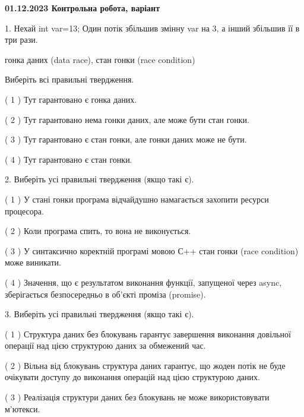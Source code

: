 \documentclass[12pt, ukrainian]{article}
\begin{document}
\vspace{4mm}
\newpage
\begin {large}

\textbf{01.12.2023 Контрольна робота, варіант  }\par


{
1. Нехай int var=13; Один потік збільшив змінну var на 3, а інший збільшив її в три рази.

гонка даних (data race), стан гонки (race condition)

Виберіть всі правильні твердження.\par
\vspace{2mm}
( 1 ) Тут гарантовано є гонка даних.%

( 2 ) Тут гарантовано нема гонки даних, але може бути стан гонки.%

( 3 ) Тут гарантовано є стан гонки, але гонки даних може не бути.%

( 4 ) Тут гарантовано є стан гонки.%


\vspace{5mm}
2. Виберіть усі правильні твердження (якщо такі є).\par
\vspace{2mm}

( 1 ) У стані гонки програма відчайдушно намагається захопити ресурси процесора.%

( 2 ) Коли програма спить, то вона не виконується.%

( 3 ) У синтаксично коректній програмі мовою С++ стан гонки (race condition) може виникати.%

( 4 ) Значення, що є результатом виконання функції, запущеної через async, зберігається безпосередньо в об’єкті проміза (promise).%


\vspace{5mm}
3. Виберіть усі правильні твердження (якщо такі є).\par
\vspace{2mm}

( 1 ) Структура даних без блокувань гарантує завершення виконання довільної операції над цією структурою даних за обмежений час.%

( 2 ) Вільна від блокувань структура даних гарантує, що жоден потік не буде очікувати доступу до виконання операцій над цією структурою даних.%

( 3 ) Реалізація структури даних без блокувань не може використовувати м’ютекси.%

}
\end{large}
\end{document}
